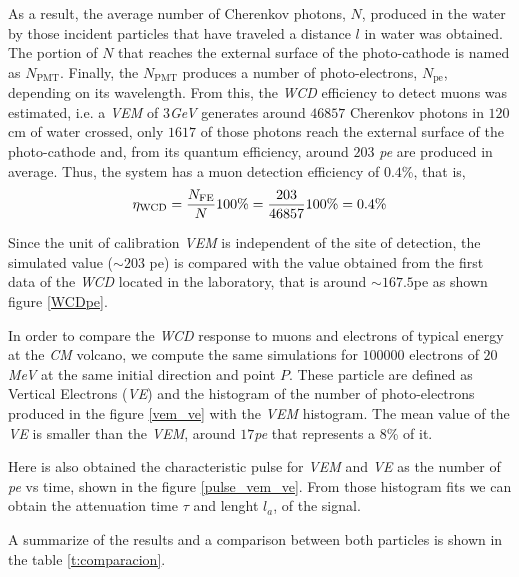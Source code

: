 \documentclass[submitting]{nst}
\begin{document}
As a result, the average number of Cherenkov photons, $N$, produced in the water by those incident particles that have traveled a distance $l$ in water was obtained. The portion of $N$ that reaches the external surface of the photo-cathode is named as $N_{\mathrm{PMT}}$. Finally, the $ N_{\mathrm{PMT}}$ produces a number of photo-electrons, $N_{\mathrm{pe}}$, depending on its wavelength. From this, the \textsl{WCD} efficiency to detect muons was estimated, i.e. a \textsl{VEM} of $3$\textsl{GeV}   generates around $46857$ Cherenkov photons in $120$cm of water crossed, only $1617$ of those photons reach the external surface of the photo-cathode and, from its quantum efficiency, around $203$ \textsl{pe} are produced in average. Thus, the system has a muon detection efficiency of $0.4$\%, that is,
\begin{equation}
\eta_{\mathrm{WCD}}=\frac{N_{\mathrm{FE}}}{N} 100\%=\frac{203}{46857}100\%=0\textnormal{.}4\%
\end{equation}

Since the unit of calibration \textsl{VEM} is independent of the site of detection, the simulated value ($\sim 203$ pe) is compared with the value obtained from the first data of the \textsl{WCD} located in the laboratory, that is around $\sim 167.5$pe as shown figure \ref{WCDpe}. 

In order to compare the \textsl{WCD} response to muons and electrons of typical energy at the \textsl{CM} volcano, we compute the same simulations for $100000$ electrons of $20$\textsl{MeV}   at the same initial direction and point $P$. These particle are defined as Vertical Electrons (\textsl{VE}) and the histogram of the number of photo-electrons produced in the figure \ref{vem_ve} with the \textsl{VEM} histogram. The mean value of the \textsl{VE} is smaller than the \textsl{VEM}, around $17$\textsl{pe} that represents a $8$\% of it.

Here is also obtained the characteristic pulse for \textsl{VEM} and \textsl{VE} as the number of \textsl{pe} vs time, shown in the figure \ref{pulse_vem_ve}. From those histogram fits we can obtain the attenuation time $\tau$ and lenght $l_a$, of the signal. 

A summarize of the results and a comparison between both particles is shown in the table \ref{t:comparacion}.
\end{document}
